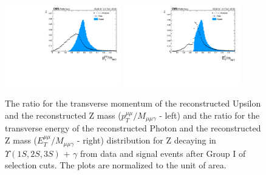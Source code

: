 \begin{figure}[!htbp]
\begin{center}
\includegraphics[width=0.45\textwidth]{figures/outputPlots/ZtoUpsilon_Cat0_ZZZZZ/au/data_x_mc/noKinCuts/h_noKin_upsilonPt_over_zMass}\hspace*{1.cm}
\includegraphics[width=0.45\textwidth]{figures/outputPlots/ZtoUpsilon_Cat0_ZZZZZ/au/data_x_mc/noKinCuts/h_noKin_photonPt_over_zMass}
\end{center}\vspace*{-.5cm}
\caption{The ratio for the transverse momentum of the reconstructed Upsilon and the reconstructed Z mass ($p_{T}^{\mu\mu}/M_{\mu\mu\gamma}$ - left) and the ratio for the transverse energy of the reconstructed Photon and the reconstructed Z mass ($E_{T}^{\mu\mu}/M_{\mu\mu\gamma}$ - right) distribution for Z decaying in $\Upsilon(1S,2S,3S)$ + $\gamma$ from data and signal events after Group I of selection cuts. The plots are normalized to the unit of area.}
\label{fig:energy_ration_ZtoUpsilon_Cat0}
\end{figure}

